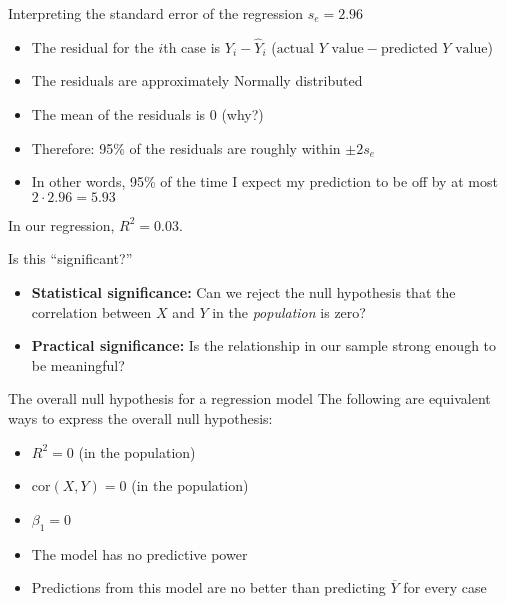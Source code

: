 \documentclass{beamer}\usepackage[]{graphicx}\usepackage[]{color}
\begin{document}
\begin{darkframes}
\begin{frame}[fragile]
    \end{frame}

    \begin{frame}{Interpreting the standard error of the regression $s_e = 2.96$}
      \begin{itemize}[<+->]
        \item The \alert{residual} for the $i$th case is $Y_i - \hat Y_i$ ($\text{actual $Y$ value} - \text{predicted $Y$ value}$)
        \item The residuals are approximately Normally distributed
        \item The mean of the residuals is 0 (why?)
        \item Therefore: 95\% of the residuals are roughly within $\pm 2 s_e$
        \item In other words, 95\% of the time I expect my prediction to be off by at most $2 \cdot 2.96 = 5.93$
      \end{itemize}
    \end{frame}

    \begin{frame}
      In our regression, $R^2=0.03$.

      Is this ``significant?''
      \pause
      \begin{itemize}[<+->]
        \item \textbf{Statistical significance:} Can we reject the null hypothesis that the correlation between $X$ and $Y$ in the \emph{population} is zero?
        \item \textbf{Practical significance:} Is the relationship in our sample strong enough to be meaningful?
      \end{itemize}
    \end{frame}

    \begin{frame}{The overall null hypothesis for a regression model}
      The following are equivalent ways to express the overall null hypothesis:
      \begin{itemize}[<+->]
        \item $R^2=0$ (in the population)
        \item $\text{cor}(X,Y)=0$ (in the population)
        \item $\beta_1=0$
        \item The model has no predictive power
        \item Predictions from this model are no better than predicting $\overline Y$ for every case
      \end{itemize}
    \end{frame}


\end{darkframes}
\end{document}

